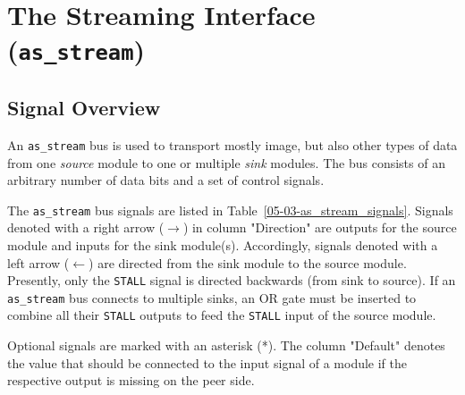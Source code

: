 


\section{The \asterics Streaming Interface (\texttt{as\_stream}) } \label{ch:05-03-interfaces-as_stream}


\subsection{Signal Overview}

An \texttt{as\_stream} bus is used to transport mostly image, but also other types of data from one \textit{source} module to one or multiple \textit{sink} modules. The bus consists of an arbitrary number of data bits and a set of control signals.

The \texttt{as\_stream} bus signals are listed in Table~\ref{05-03-as_stream_signals}. Signals denoted with a right arrow ($\rightarrow$) in column "Direction" are outputs for the source module and inputs for the sink module(s). Accordingly, signals denoted with a left arrow ($\leftarrow$) are directed from the sink module to the source module. Presently, only the \texttt{STALL} signal is directed backwards (from sink to source). If an \texttt{as\_stream} bus connects to multiple sinks, an OR gate must be inserted to combine all their \texttt{STALL} outputs to feed the \texttt{STALL} input of the source module.

Optional signals are marked with an asterisk (*). The column "Default" denotes the value that should be connected to the input signal of a module if the respective output is missing on the peer side.

